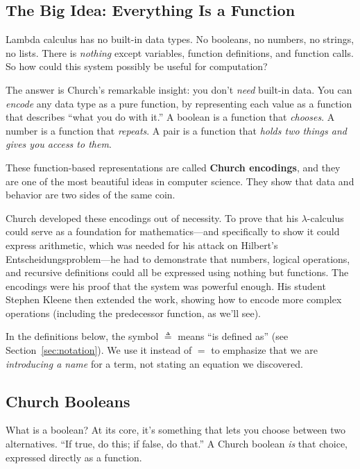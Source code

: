 \documentclass[11pt,a4paper]{article}
\theoremstyle{definition}
\newcommand{\lam}{\lambda}
\begin{document}
\subsection{The Big Idea: Everything Is a Function}

Lambda calculus has no built-in data types. No booleans, no numbers, no strings,
no lists. There is \emph{nothing} except variables, function definitions, and
function calls. So how could this system possibly be useful for computation?

The answer is Church's remarkable insight: you don't \emph{need} built-in data.
You can \emph{encode} any data type as a pure function, by representing each
value as a function that describes ``what you do with it.'' A boolean
is a function that \emph{chooses}. A number is a function that
\emph{repeats}. A pair is a function that \emph{holds two things and gives
you access to them}.

These function-based representations are called \textbf{Church encodings}, and
they are one of the most beautiful ideas in computer science. They show that
data and behavior are two sides of the same coin.

Church developed these encodings out of necessity. To prove that his
$\lam$-calculus could serve as a foundation for mathematics---and specifically
to show it could express arithmetic, which was needed for his attack on
Hilbert's Entscheidungsproblem---he had to demonstrate that numbers, logical
operations, and recursive definitions could all be expressed using nothing but
functions. The encodings were his proof that the system was powerful enough.
His student Stephen Kleene then extended the work, showing how to encode more
complex operations (including the predecessor function, as we'll see).

In the definitions below, the symbol $\triangleq$ means ``is defined as''
(see Section~\ref{sec:notation}). We use it instead of $=$ to emphasize that
we are \emph{introducing a name} for a term, not stating an equation we
discovered.

\subsection{Church Booleans}

What is a boolean? At its core, it's something that lets you choose between
two alternatives. ``If true, do this; if false, do that.'' A Church boolean
\emph{is} that choice, expressed directly as a function.
\end{document}
